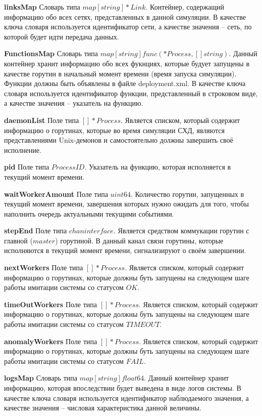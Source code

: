 \textbf{linksMap}      
Словарь типа $map[string]*Link$. Контейнер, содержащий информацию обо всех сетях, представленных в данной симуляции.  В качестве ключа словаря используется идентификатор сети, а качестве значения -- сеть, по которой будет идти передача данных.

\textbf{FunctionsMap} 
Словарь типа $map[string]func(*Process, []string)$. Данный контейнер хранит информацию обо всех фукнциях, которые будует запущены в качестве горутин в начальный момент времени (время запуска симуляции). Функции должны быть объявлены в файле deployment.xml.  В качестве ключа словаря используется идентификатор функции, представленный в строковом виде, а качестве значения -- указатель на функцию.

\textbf{daemonList}  
Поле типа $[]*Process$. Является списком, который содержит информацию о горутинах, которые во время симуляции СХД, являются представлениями Unix-демонов и самостоятельно должны завершить своё исполнение.

\textbf{pid} 
Поле типа $ProcessID$. Указатель на функцию, которая исполняется в текущий момент времени.

\textbf{waitWorkerAmount} 
Поле типа $uint64$. Количество горутин, запущенных в текущий момент времени, завершения которых нужно ожидать для того, чтобы наполнить очередь актуальными текущими событиями. 

\textbf{stepEnd}        
Поле типа $chan interface{}$. Является средством коммукации горутин с главной ($master$) горутиной. В данный канал связи горутины, которые исполняются в текущий момент времени, сигнализируют о своём завершении.

\textbf{nextWorkers}
Поле типа $[]*Process$. Является списком, который содержит информацию о горутинах, которые должны буть запущены на следующем шаге работы имитации системы со статусом $OK$.

\textbf{timeOutWorkers}   
Поле типа $[]*Process$. Является списком, который содержит информацию о горутинах, которые должны буть запущены на следующем шаге работы имитации системы со статусом $TIMEOUT$.

\textbf{anomalyWorkers}   
Поле типа $[]*Process$. Является списком, который содержит информацию о горутинах, которые должны буть запущены на следующем шаге работы имитации системы со статусом $FAIL$.

\textbf{logsMap}  
Словарь типа $map[string]float64$. Данный контейнер хранит информацию, которая впоследствии будет выведена в виде логов системы.  В качестве ключа словаря используется идентификатор наблюдаемого значения, а качестве значения -- числовая характеристика данной величины.

